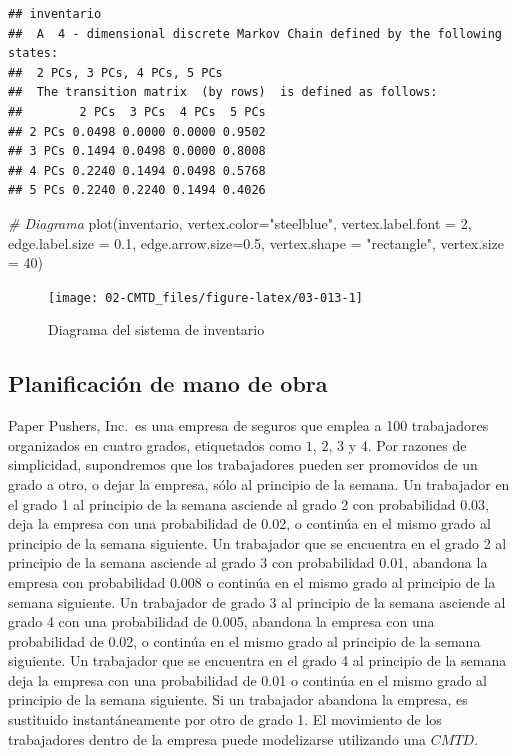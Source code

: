 \documentclass[
]{book}
\newenvironment{Shaded}{\begin{snugshade}}{\end{snugshade}}
\newcommand{\AttributeTok}[1]{\textcolor[rgb]{0.77,0.63,0.00}{#1}}
\newcommand{\CommentTok}[1]{\textcolor[rgb]{0.56,0.35,0.01}{\textit{#1}}}
\newcommand{\DecValTok}[1]{\textcolor[rgb]{0.00,0.00,0.81}{#1}}
\newcommand{\FloatTok}[1]{\textcolor[rgb]{0.00,0.00,0.81}{#1}}
\newcommand{\FunctionTok}[1]{\textcolor[rgb]{0.00,0.00,0.00}{#1}}
\newcommand{\NormalTok}[1]{#1}
\newcommand{\StringTok}[1]{\textcolor[rgb]{0.31,0.60,0.02}{#1}}
\theoremstyle{definition}
\theoremstyle{definition}
\theoremstyle{definition}
\theoremstyle{definition}
\theoremstyle{remark}
\begin{document}
\begin{verbatim}
## inventario 
##  A  4 - dimensional discrete Markov Chain defined by the following states: 
##  2 PCs, 3 PCs, 4 PCs, 5 PCs 
##  The transition matrix  (by rows)  is defined as follows: 
##        2 PCs  3 PCs  4 PCs  5 PCs
## 2 PCs 0.0498 0.0000 0.0000 0.9502
## 3 PCs 0.1494 0.0498 0.0000 0.8008
## 4 PCs 0.2240 0.1494 0.0498 0.5768
## 5 PCs 0.2240 0.2240 0.1494 0.4026
\end{verbatim}

\begin{Shaded}
\begin{Highlighting}[]
\CommentTok{\# Diagrama}
\FunctionTok{plot}\NormalTok{(inventario, }\AttributeTok{vertex.color=}\StringTok{"steelblue"}\NormalTok{, }
     \AttributeTok{vertex.label.font =} \DecValTok{2}\NormalTok{, }
     \AttributeTok{edge.label.size =} \FloatTok{0.1}\NormalTok{,}
     \AttributeTok{edge.arrow.size=}\FloatTok{0.5}\NormalTok{, }
     \AttributeTok{vertex.shape =} \StringTok{"rectangle"}\NormalTok{, }
     \AttributeTok{vertex.size =} \DecValTok{40}\NormalTok{)}
\end{Highlighting}
\end{Shaded}

\begin{figure}

{\centering \texttt{[image: 02-CMTD\_files/figure-latex/03-013-1]} 

}

\caption{Diagrama del sistema de inventario}\label{fig:03-013}
\end{figure}

\hypertarget{planificacion}{%
\subsection{Planificación de mano de obra}\label{planificacion}}

Paper Pushers, Inc.~es una empresa de seguros que emplea a 100 trabajadores organizados en cuatro grados, etiquetados como \(1\), \(2\), \(3\) y \(4\). Por razones de simplicidad, supondremos que los trabajadores pueden ser promovidos de un grado a otro, o dejar la empresa, sólo al principio de la semana. Un trabajador en el grado 1 al principio de la semana asciende al grado 2 con probabilidad 0.03, deja la empresa con una probabilidad de 0.02, o continúa en el mismo grado al principio de la semana siguiente. Un trabajador que se encuentra en el grado 2 al principio de la semana asciende al grado 3 con probabilidad 0.01, abandona la empresa con probabilidad 0.008 o continúa en el mismo grado al principio de la semana siguiente. Un trabajador de grado 3 al principio de la semana asciende al grado 4 con una probabilidad de 0.005, abandona la empresa con una probabilidad de 0.02, o continúa en el mismo grado al principio de la semana siguiente. Un trabajador que se encuentra en el grado 4 al principio de la semana deja la empresa con una probabilidad de 0.01 o continúa en el mismo grado al principio de la semana siguiente. Si un trabajador abandona la empresa, es sustituido instantáneamente por otro de grado 1. El movimiento de los trabajadores dentro de la empresa puede modelizarse utilizando una \(CMTD\).
\end{document}
